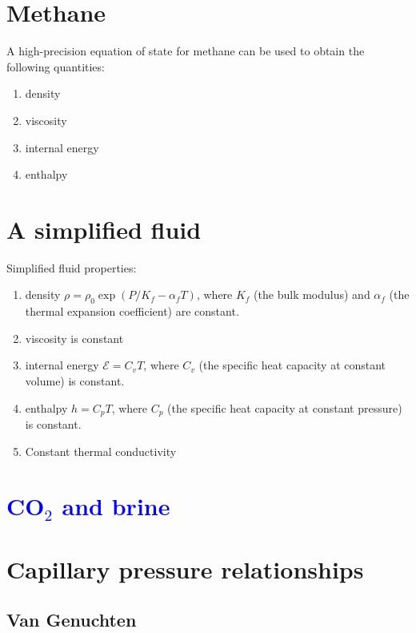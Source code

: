 \documentclass[12pt]{report}
\def\energydens{\mathcal{E}}
\begin{document}
\section{Methane}

A high-precision equation of state for methane can be used to
obtain the following quantities:
\begin{enumerate}
\item density
\item viscosity
\item internal energy
\item enthalpy
\end{enumerate}

\section{A simplified fluid}

Simplified fluid properties:
\begin{enumerate}
\item density $\rho = \rho_{0}\exp(P/K_{f} - \alpha_{f} T)$, where $K_{f}$ (the
  bulk modulus) and $\alpha_{f}$ (the thermal expansion coefficient) are
  constant.
\item viscosity is constant
\item internal energy $\energydens = C_{v}T$, where $C_{v}$ (the
  specific heat capacity at constant volume) is constant.
\item enthalpy $h = C_{p}T$, where $C_{p}$ (the specific heat capacity
  at constant pressure) is constant.
\item Constant thermal conductivity
\end{enumerate}

\section{\textcolor{blue}{CO$_{2}$ and brine}}

\section{Capillary pressure relationships}
\label{pc.sec}

\subsection{Van Genuchten}
\end{document}
